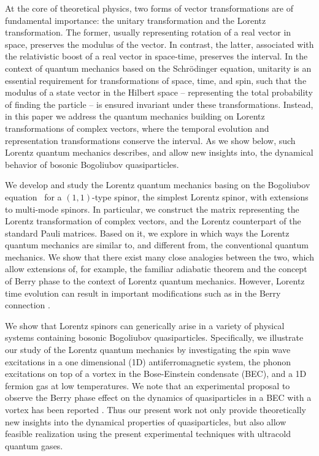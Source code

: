 \documentclass[pra,epsfig,rotate,superscriptaddress,showpacs]{revtex4}
\begin{document}
At the core of theoretical physics, two forms of vector transformations are of fundamental importance: the unitary transformation and the Lorentz transformation. The former, usually representing rotation of a real vector in space, preserves the modulus of the vector. In contrast, the latter, associated with the relativistic boost of a real vector in space-time, preserves the interval. In the context of quantum mechanics based on the Schr\"odinger equation, unitarity is an essential requirement for transformations of space, time, and spin, such that the modulus of a state vector in the Hilbert space -- representing the total probability of finding the particle -- is ensured invariant under these transformations. Instead, in this paper we address the quantum mechanics building on Lorentz transformations of complex vectors, where the temporal evolution and representation transformations conserve the interval. As we show below, such Lorentz quantum mechanics describes, and allow new insights into, the dynamical behavior of bosonic Bogoliubov quasiparticles.

We develop and study the Lorentz quantum mechanics basing on the Bogoliubov
equation~\cite{Bogoliubov,njp} for a $(1,1)$-type spinor, the simplest Lorentz spinor, with extensions to multi-mode spinors. In particular, we construct the matrix representing the Lorentz transformation of complex vectors, and the Lorentz counterpart of the standard Pauli matrices. Based on it, we explore in which ways the Lorentz quantum mechanics are similar to, and different from, the conventional quantum mechanics. We show that there exist many close analogies between the two, which allow extensions of, for example, the familiar adiabatic theorem and the concept of Berry phase to the context of Lorentz quantum mechanics. However, Lorentz time evolution can result in important modifications such as in the Berry connection \cite{ZhangNiu}.


We show that Lorentz spinors can generically arise in a variety of physical systems containing bosonic Bogoliubov quasiparticles. Specifically, we illustrate our study of the Lorentz quantum mechanics by investigating the spin wave excitations in a one dimensional (1D) antiferromagnetic system, the phonon excitations on top of a vortex in the Bose-Einstein condensate (BEC), and a 1D fermion gas at low temperatures. We note that an experimental proposal to observe the Berry phase effect on the dynamics of quasiparticles in a BEC with a vortex has been reported \cite{ZhangNiu}. Thus our present work  not only provide theoretically new insights into the dynamical properties of quasiparticles, but also allow feasible realization using the present experimental techniques with ultracold quantum gases.
\end{document}
